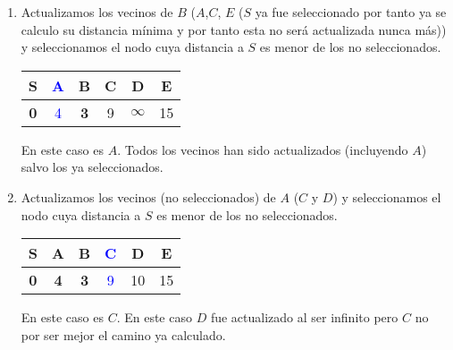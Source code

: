 \documentclass[12pt]{article}
\begin{document}
\begin{ejercicio}
\begin{enumerate}
            \item 
            Actualizamos los vecinos de $B$ ($A$,$C$, $E$ ($S$ ya fue 
            seleccionado por tanto ya se calculo su distancia mínima 
            y por tanto esta no será actualizada nunca más)) 
            y seleccionamos el nodo 
            cuya distancia a $S$ es menor de los no seleccionados.
            \begin{center}
                \begin{tabular}{|c|c|c|c|c|c|}
                    \hline
                    \textbf{S}&\textcolor{blue}{A}&\textbf{B}&C&D&E \\
                    \hline
                    \textbf{0}&\textcolor{blue}{4}&\textbf{3}&
                    9&$\infty$&15 \\
                    \hline
                \end{tabular}
            \end{center}
            En este caso es $A$. Todos los vecinos han sido 
            actualizados (incluyendo $A$) salvo los ya seleccionados.

            \item 
            Actualizamos los vecinos (no seleccionados) de $A$ ($C$ y $D$) 
            y seleccionamos el nodo 
            cuya distancia a $S$ es menor de los no seleccionados.
            \begin{center}
                \begin{tabular}{|c|c|c|c|c|c|}
                    \hline
                    \textbf{S}&\textbf{A}&\textbf{B}&\textcolor{blue}{C}&D&E \\
                    \hline
                    \textbf{0}&\textbf{4}&\textbf{3}&
                    \textcolor{blue}{9}&10&15 \\
                    \hline
                \end{tabular}
            \end{center}
            En este caso es $C$. En este caso $D$ fue actualizado al 
            ser infinito pero $C$ no por ser mejor el camino ya 
            calculado.


\end{enumerate}
\end{ejercicio}
\end{document}
